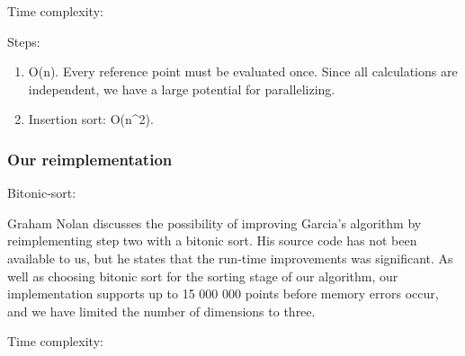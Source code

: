 Time complexity:

Steps:

\begin{enumerate}
    \item O(n). Every reference point must be evaluated once. Since all calculations are independent, we have a large potential for parallelizing.
    \item Insertion sort: O(n^2).
\end{enumerate}

\subsubsection{Our reimplementation} %
\label{ssub:our_reimplementation}

Bitonic-sort:

Graham Nolan discusses the possibility of improving Garcia's algorithm by reimplementing step two with a bitonic sort. His source code has not been available to us, but he states that the run-time improvements was significant. As well as choosing bitonic sort for the sorting stage of our algorithm, our implementation supports up to 15 000 000 points before memory errors occur, and we have limited the number of dimensions to three.

Time complexity:

